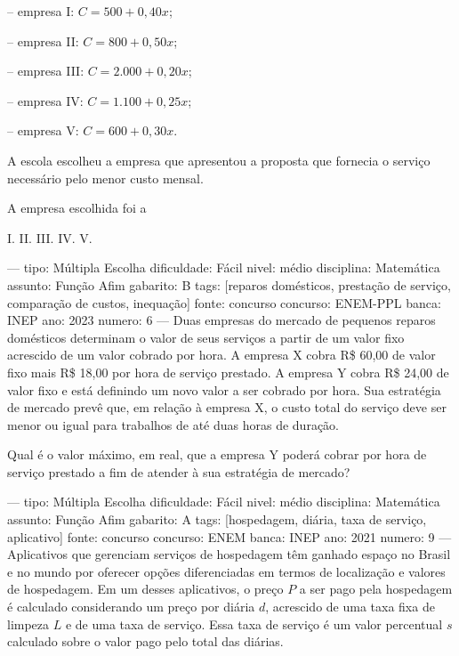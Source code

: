 -- empresa I: \( C = 500 + 0{,}40x \);

-- empresa II: \( C = 800 + 0{,}50x \);

-- empresa III: \( C = 2{.}000 + 0{,}20x \);

-- empresa IV: \( C = 1{.}100 + 0{,}25x \);

-- empresa V: \( C = 600 + 0{,}30x \).

A escola escolheu a empresa que apresentou a proposta que fornecia o serviço necessário pelo menor custo mensal.

A empresa escolhida foi a
\begin{oneparchoices}
\choice I.
\choice II.
\choice III.
\correctchoice IV.
\choice V.
\end{oneparchoices}

---
tipo: Múltipla Escolha
dificuldade: Fácil
nivel: médio
disciplina: Matemática
assunto: Função Afim
gabarito: B
tags: [reparos domésticos, prestação de serviço, comparação de custos, inequação]
fonte: concurso
concurso: ENEM-PPL
banca: INEP
ano: 2023
numero: 6
---
\question
Duas empresas do mercado de pequenos reparos domésticos determinam o valor de seus serviços a partir de um valor fixo acrescido de um valor cobrado por hora. A empresa X cobra R\$ 60,00 de valor fixo mais R\$ 18,00 por hora de serviço prestado. A empresa Y cobra R\$ 24,00 de valor fixo e está definindo um novo valor a ser cobrado por hora. Sua estratégia de mercado prevê que, em relação à empresa X, o custo total do serviço deve ser menor ou igual para trabalhos de até duas horas de duração.

Qual é o valor máximo, em real, que a empresa Y poderá cobrar por hora de serviço prestado a fim de atender à sua estratégia de mercado?
\begin{oneparchoices}
\end{oneparchoices}

---
tipo: Múltipla Escolha
dificuldade: Fácil
nivel: médio
disciplina: Matemática
assunto: Função Afim
gabarito: A
tags: [hospedagem, diária, taxa de serviço, aplicativo]
fonte: concurso
concurso: ENEM
banca: INEP
ano: 2021
numero: 9
---
\question
Aplicativos que gerenciam serviços de hospedagem têm ganhado espaço no Brasil e no mundo por oferecer opções diferenciadas em termos de localização e valores de hospedagem. Em um desses aplicativos, o preço \( P \) a ser pago pela hospedagem é calculado considerando um preço por diária \( d \), acrescido de uma taxa fixa de limpeza \( L \) e de uma taxa de serviço. Essa taxa de serviço é um valor percentual \( s \) calculado sobre o valor pago pelo total das diárias.

